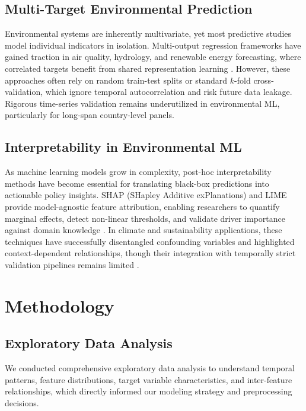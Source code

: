 \documentclass[conference]{IEEEtran}
\begin{document}
\subsection{Multi-Target Environmental Prediction}

Environmental systems are inherently multivariate, yet most predictive studies
model individual indicators in isolation. Multi-output regression frameworks
have gained traction in air quality, hydrology, and renewable energy
forecasting, where correlated targets benefit from shared representation
learning \cite{demir2021multi}. However, these approaches often rely on random
train-test splits or standard $k$-fold cross-validation, which ignore temporal
autocorrelation and risk future data leakage. Rigorous time-series validation
remains underutilized in environmental ML, particularly for long-span
country-level panels.

\subsection{Interpretability in Environmental ML}

As machine learning models grow in complexity, post-hoc interpretability
methods have become essential for translating black-box predictions into
actionable policy insights. SHAP (SHapley Additive exPlanations) and LIME
provide model-agnostic feature attribution, enabling researchers to quantify
marginal effects, detect non-linear thresholds, and validate driver importance
against domain knowledge \cite{lundberg2017shap}. In climate and sustainability
applications, these techniques have successfully disentangled confounding
variables and highlighted context-dependent relationships, though their
integration with temporally strict validation pipelines remains
limited \cite{molnar2022interpretable}.

\section{Methodology}

\subsection{Exploratory Data Analysis}

We conducted comprehensive exploratory data analysis to understand temporal patterns, 
feature distributions, target variable characteristics, and inter-feature relationships, 
which directly informed our modeling strategy and preprocessing decisions.
\end{document}
